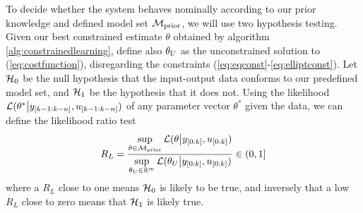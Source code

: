 
To decide whether the system behaves nominally according to our prior knowledge and
defined model set $\mathcal{M}_{\text{prior}}$, we will use two hypothesis testing.
Given our best constrained estimate $\theta$ obtained by algorithm \ref{alg:constrainedlearning},
define also $\theta_{U}$ as the unconstrained solution to (\ref{eq:costfunction}), disregarding
the constraints (\ref{eq:eqconst}-\ref{eq:elliptconst}).
Let $\mathcal{H}_0$ be the null hypothesis that the input-output data conforms to our predefined model set,
and $\mathcal{H}_1$ be the hypothesis that it does not.
Using the likelihood $\mathcal{L}(\theta^* \big{\vert} y_{[k-1:k-n]}, u_{[k-1:k-n]})$
of any parameter vector $\theta^*$ given the data, we can define the
likelihood ratio test
\begin{equation}
    R_L = \frac{\sup\limits_{\theta \in \mathcal{M}_{\text{prior}}}
    \mathcal{L}(\theta \big{\vert} y_{[0:k]}, u_{[0:k]})}
    {\sup\limits_{\theta_{U} \in \mathbb{R}^m}
    \mathcal{L}(\theta_{U} \big{\vert} y_{[0:k]}, u_{[0:k]})} \in (0,1]
\end{equation}
where a $R_L$ close to one means  $\mathcal{H}_0$ is likely to be true, and
inversely that a low $R_L$ close to zero means that $\mathcal{H}_1$ is likely true.

